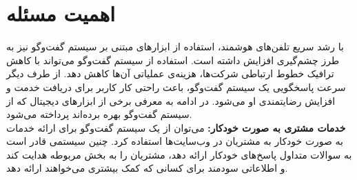 \section{اهمیت مسئله}
با رشد سریع تلفن‌های هوشمند، استفاده از ابزارهای مبتنی بر سیستم گفت‌وگو نیز به طرز چشم‌گیری افزایش داشته است. استفاده از سیستم گفت‌وگو می‌تواند با کاهش ترافیک خطوط ارتباطی شرکت‌ها، هزینه‌ی عملیاتی آن‌ها کاهش دهد. از طرف دیگر سرعت پاسخگویی یک سیستم گفت‌وگو، باعث راحتی کار کاربر برای دریافت خدمت و افزایش رضایتمندی او می‌شود. در ادامه به معرفی برخی از ابزارهای دیجیتال که از سیستم گفت‌وگو بهره برده‌اند پرداخته می‌شود.
\\
	\textbf{ خدمات مشتری به صورت خودکار:}
می‌توان از یک سیستم گفت‌وگو برای ارائه خدمات به صورت خودکار به مشتریان در وب‌سایت‌ها استفاده کرد. چنین سیستمی قادر است به سوالات متداول پاسخ‌های خودکار ارائه دهد، مشتریان را به بخش مربوطه هدایت کند و اطلاعاتی سودمند برای کسانی که کمک بیشتری می‌خواهند ارائه دهد.
